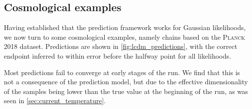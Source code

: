 \documentclass[usenatbib]{mnras}
\begin{document}
\subsection{Cosmological examples}\label{subsec:cosmological_examples}
Having established that the prediction framework works for Gaussian likelihoods, we now turn to some cosmological examples, namely chains based on the \textsc{Planck 2018} dataset. Predictions are shown in \cref{fig:lcdm_predictions}, with the correct endpoint inferred to within error before the halfway point for all likelihoods.
\par
Most predictions fail to converge at early stages of the run. We find that this is not a consequence of the prediction model, but due to the effective dimensionality of the samples being lower than the true value at the beginning of the run, as was seen in \cref{sec:current_temperature}.
\end{document}
